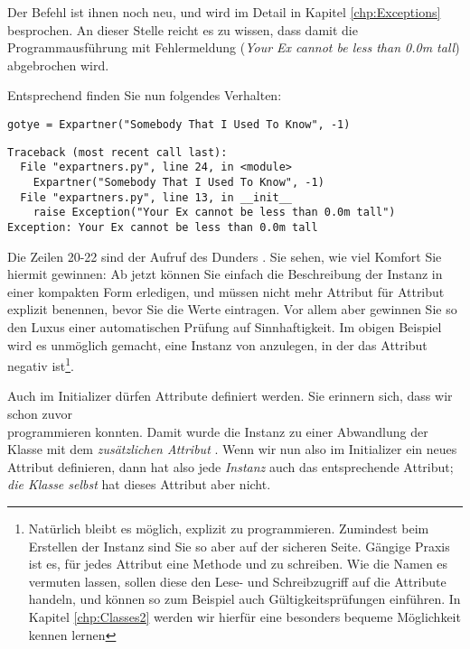 Der Befehl  ist ihnen noch neu, und wird im Detail in Kapitel \ref{chp:Exceptions} besprochen. An dieser Stelle reicht es zu wissen, dass damit die Programmausführung mit Fehlermeldung (\emph{Your Ex cannot be less than 0.0m tall}) abgebrochen wird.

Entsprechend finden Sie nun folgendes Verhalten:
\begin{codebox}
\begin{verbatim}
gotye = Expartner("Somebody That I Used To Know", -1)
\end{verbatim}
\end{codebox}
\begin{cmdbox}
\begin{verbatim}
Traceback (most recent call last):
  File "expartners.py", line 24, in <module>
    Expartner("Somebody That I Used To Know", -1)
  File "expartners.py", line 13, in __init__
    raise Exception("Your Ex cannot be less than 0.0m tall")
Exception: Your Ex cannot be less than 0.0m tall
\end{verbatim}
\end{cmdbox}

Die Zeilen 20-22 sind der Aufruf des Dunders . Sie sehen, wie viel Komfort Sie hiermit gewinnen: Ab jetzt können Sie einfach die Beschreibung der Instanz  in einer kompakten Form erledigen, und müssen nicht mehr Attribut für Attribut explizit benennen, bevor Sie die Werte eintragen. Vor allem aber gewinnen Sie so den Luxus einer automatischen Prüfung auf Sinnhaftigkeit. Im obigen Beispiel wird es unmöglich gemacht, eine Instanz von  anzulegen, in der das Attribut  negativ ist\footnote{Natürlich bleibt es möglich, explizit  zu programmieren. Zumindest beim Erstellen der Instanz sind Sie so aber auf der sicheren Seite. Gängige Praxis ist es, für jedes Attribut eine Methode  und  zu schreiben. Wie die Namen es vermuten lassen, sollen diese den Lese- und Schreibzugriff auf die Attribute handeln, und können so zum Beispiel auch Gültigkeitsprüfungen einführen. In Kapitel \ref{chp:Classes2} werden wir hierfür eine besonders bequeme Möglichkeit kennen lernen}.

Auch im Initializer dürfen Attribute definiert werden. Sie erinnern sich, dass wir schon zuvor \\ programmieren konnten. Damit wurde die Instanz  zu einer Abwandlung der Klasse  mit dem \emph{zusätzlichen Attribut} . Wenn wir nun also im Initializer ein neues Attribut definieren, dann hat also jede \emph{Instanz} auch das entsprechende Attribut; \emph{die Klasse selbst} hat dieses Attribut aber nicht.

